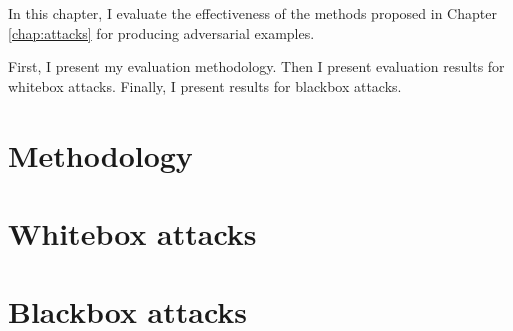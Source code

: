 In this chapter, I evaluate the effectiveness of the methods proposed in Chapter \ref{chap:attacks} for producing adversarial examples.

First, I present my evaluation methodology. Then I present evaluation results for whitebox attacks. Finally, I present results for blackbox attacks.

\section{Methodology}
\label{sec:methodology}


\section{Whitebox attacks}
\label{sec:whitebox-attacks}


\section{Blackbox attacks}
\label{sec:blackbox-attacks}
